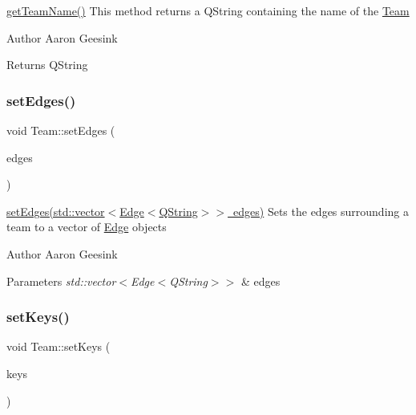 \mbox{\hyperlink{class_team_a36148ba356032791f4789a493e1ee149}{get\+Team\+Name()}} This method returns a Q\+String containing the name of the \mbox{\hyperlink{class_team}{Team}} 

\begin{DoxyAuthor}{Author}
Aaron Geesink 
\end{DoxyAuthor}
\begin{DoxyReturn}{Returns}
Q\+String 
\end{DoxyReturn}
\mbox{\label{class_team_adf74a36b8444f5dff3de272e9d79873f}} 
\subsubsection{\texorpdfstring{setEdges()}{setEdges()}}
{\footnotesize\ttfamily void Team\+::set\+Edges (\begin{DoxyParamCaption}\item[{std\+::vector$<$ \mbox{\hyperlink{struct_edge}{Edge}}$<$ Q\+String $>$$>$}]{edges }\end{DoxyParamCaption})}



\mbox{\hyperlink{class_team_adf74a36b8444f5dff3de272e9d79873f}{set\+Edges(std\+::vector$<$\+Edge$<$\+Q\+String$>$$>$ edges)}} Sets the edges surrounding a team to a vector of \mbox{\hyperlink{struct_edge}{Edge}} objects 

\begin{DoxyAuthor}{Author}
Aaron Geesink 
\end{DoxyAuthor}

\begin{DoxyParams}{Parameters}
{\em std\+::vector$<$\+Edge$<$\+Q\+String$>$$>$} & edges \\
\hline
\end{DoxyParams}
\mbox{\label{class_team_a70009ebba2b8dc25c20d13a02b6b6780}} 
\subsubsection{\texorpdfstring{setKeys()}{setKeys()}}
{\footnotesize\ttfamily void Team\+::set\+Keys (\begin{DoxyParamCaption}\item[{std\+::vector$<$ int $>$}]{keys }\end{DoxyParamCaption})}




